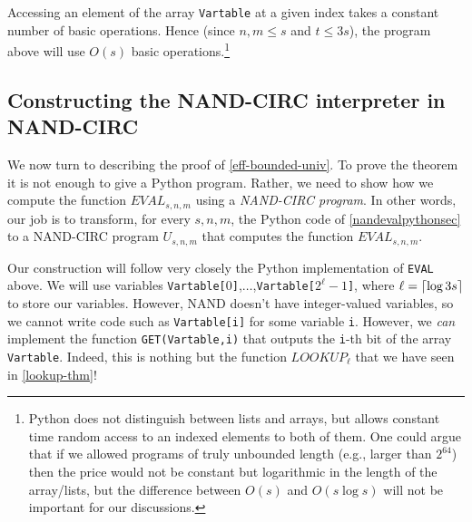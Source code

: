 Accessing an element of the array \texttt{Vartable} at a given index
takes a constant number of basic operations. Hence (since \(n,m \leq s\)
and \(t \leq 3s\)), the program above will use \(O(s)\) basic
operations.\footnote{Python does not distinguish between lists and
  arrays, but allows constant time random access to an indexed elements
  to both of them. One could argue that if we allowed programs of truly
  unbounded length (e.g., larger than \(2^{64}\)) then the price would
  not be constant but logarithmic in the length of the array/lists, but
  the difference between \(O(s)\) and \(O(s \log s)\) will not be
  important for our discussions.}

\subsection{Constructing the NAND-CIRC interpreter in
NAND-CIRC}\label{Constructing-the-NAND-CIR}

We now turn to describing the proof of \cref{eff-bounded-univ}. To prove
the theorem it is not enough to give a Python program. Rather, we need
to show how we compute the function
\(\ensuremath{\mathit{EVAL}}_{s,n,m}\) using a \emph{NAND-CIRC program}.
In other words, our job is to transform, for every \(s,n,m\), the Python
code of \cref{nandevalpythonsec} to a NAND-CIRC program \(U_{s,n,m}\)
that computes the function \(\ensuremath{\mathit{EVAL}}_{s,n,m}\).


Our construction will follow very closely the Python implementation of
\texttt{EVAL} above. We will use variables
\texttt{Vartable[}\(0\)\texttt{]},\(\ldots\),\texttt{Vartable[}\(2^\ell-1\)\texttt{]},
where \(\ell = \lceil \log 3s \rceil\) to store our variables. However, NAND
doesn't have integer-valued variables, so we cannot write code such as
\texttt{Vartable[i]} for some variable \texttt{i}. However, we
\emph{can} implement the function \texttt{GET(Vartable,i)} that outputs
the \texttt{i}-th bit of the array \texttt{Vartable}. Indeed, this is
nothing but the function \(\ensuremath{\mathit{LOOKUP}}_\ell\) that we
have seen in \cref{lookup-thm}!

